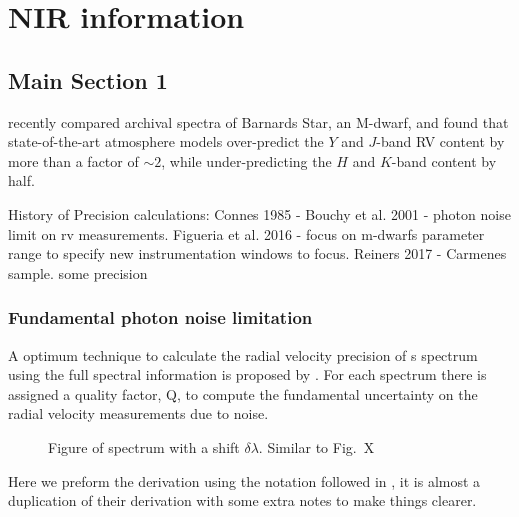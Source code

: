 
\chapter{NIR information}  %

\label{cha:nir_content}


\section{Main Section 1}


\citet{artigau_optical_2018} recently compared archival spectra of Barnards Star, an M-dwarf, and found that state-of-the-art atmosphere models over-predict the $Y$ and $J$-band RV content by more than a factor of $\sim$$2$, while under-predicting the $H$ and $K$-band content by half.
 

History of Precision calculations:
Connes 1985 -
Bouchy et al. 2001  - photon noise limit on rv measurements.   
Figueria et al. 2016 - focus on m-dwarfs parameter range to specify new instrumentation windows to focus.
Reiners 2017 -  Carmenes sample. some precision



\subsection{Fundamental photon noise limitation}
A optimum technique to calculate the radial velocity precision of s spectrum using the full spectral information is proposed by \citet{Connes1985}. For each spectrum there is assigned a quality factor, Q, to compute the fundamental uncertainty on the radial velocity measurements due to noise.

\begin{figure}
    \caption{Figure of spectrum with a shift $\delta \lambda$. Similar to \citet{Connes1985} Fig.~X}
\end{figure}

Here we preform the derivation using the notation followed in \citet{bouchy_fundamental_2001}, it is almost a duplication of their derivation with some extra notes to make things clearer.


